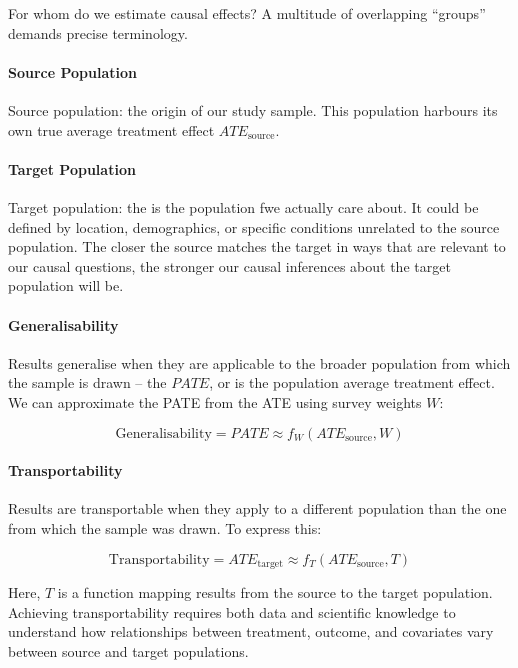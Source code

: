 \documentclass[
  singlecolumn]{article}
\let\oldparagraph\paragraph
\renewcommand{\paragraph}[1]{\oldparagraph{#1}\mbox{}}
\begin{document}
For whom do we estimate causal effects? A multitude of overlapping
``groups'' demands precise terminology.

\paragraph{Source Population}\label{source-population}

Source population: the origin of our study sample. This population
harbours its own true average treatment effect \(ATE_{\text{source}}\).

\paragraph{Target Population}\label{target-population}

Target population: the is the population fwe actually care about. It
could be defined by location, demographics, or specific conditions
unrelated to the source population. The closer the source matches the
target in ways that are relevant to our causal questions, the stronger
our causal inferences about the target population will be.

\paragraph{\texorpdfstring{\textbf{Generalisability}}{Generalisability}}\label{generalisability}

Results generalise when they are applicable to the broader population
from which the sample is drawn -- the \(PATE\), or is the population
average treatment effect. We can approximate the PATE from the ATE using
survey weights \(W\):

\[
\text{Generalisability} = PATE \approx f_{W}(ATE_{\text{source}}, W)
\]

\paragraph{\texorpdfstring{\textbf{Transportability}}{Transportability}}\label{transportability}

Results are transportable when they apply to a different population than
the one from which the sample was drawn. To express this:

\[
\text{Transportability} = ATE_{\text{target}} \approx f_{T}(ATE_{\text{source}}, T)
\]

Here, \(T\) is a function mapping results from the source to the target
population. Achieving transportability requires both data and scientific
knowledge to understand how relationships between treatment, outcome,
and covariates vary between source and target populations.
\end{document}

